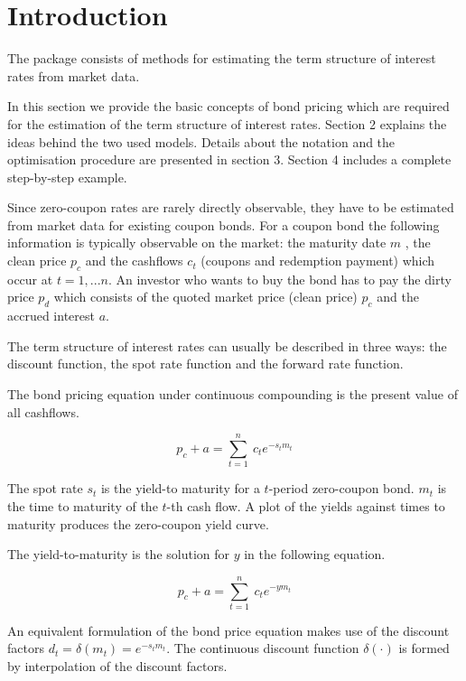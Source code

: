 \section{Introduction}

\cite{BIS2005}


The  package  consists of methods for estimating the term structure of interest rates from market data.

In this section we provide the basic concepts of bond pricing which are required for the estimation of the term structure of interest rates. Section 2 explains the ideas behind the two used models. Details about the notation and the optimisation procedure are presented in section 3. Section 4 includes a complete step-by-step example.


Since zero-coupon rates are rarely directly observable, they have to be estimated from market data for existing coupon bonds. For a coupon bond the following information is typically observable on the market: the maturity date $m$ , the clean price $p_c$ and the cashflows $c_t$ (coupons and redemption payment) which occur at $t=1,...n$. An investor who wants to buy the bond has to pay the dirty price $p_d$ which consists of the quoted market price (clean price) $p_c$ and the accrued interest $a$.

The term structure of interest rates can usually be described in three ways: the discount function, the
spot rate function and the forward rate function.

The bond pricing equation under continuous compounding is the present value of all cashflows.

\begin{equation}
  \label{bondpriceeq}
  p_c+a = \sum_{t=1}^n \ c_t e^{-s_tm_t}
\end{equation}

The spot rate $s_t$ is the yield-to maturity for a $t$-period zero-coupon bond. $m_t$ is the time to maturity of the $t$-th cash flow. A plot of the yields against times to maturity produces the zero-coupon yield curve.

The yield-to-maturity is the solution for $y$ in the following equation.

\begin{equation}
  \label{yield}
  p_c+a=\sum_{t=1}^n \ c_t e^{-ym_t}
\end{equation}

An equivalent formulation of the bond price equation makes use of the discount factors $d_t=\delta(m_t)=e^{-s_tm_t}$. The continuous discount function $\delta(\cdot)$ is formed by interpolation of the discount factors.

